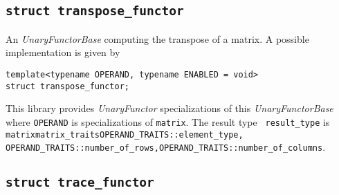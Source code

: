\documentclass[oneside]{book}
\begin{document}
\subsection{\texttt{struct transpose\_functor}}
An \textit{UnaryFunctorBase} computing the transpose of a matrix.
A possible implementation is given by
\begin{verbatim}
template<typename OPERAND, typename ENABLED = void>
struct transpose_functor;
\end{verbatim}

\noindent{}This library provides \textit{UnaryFunctor} specializations of this \textit{UnaryFunctorBase}
where \texttt{OPERAND} is specializations of \texttt{matrix}. The result type       \texttt{
result\_type} is \texttt{matrix\textlangle matrix\_traits\textlangle OPERAND\_TRAITS::element\_type,\newline
OPERAND\_TRAITS::number\_of\_rows,OPERAND\_TRAITS::number\_of\_columns\textrangle\textrangle}.

\subsection{\texttt{struct trace\_functor}}
\end{document}
